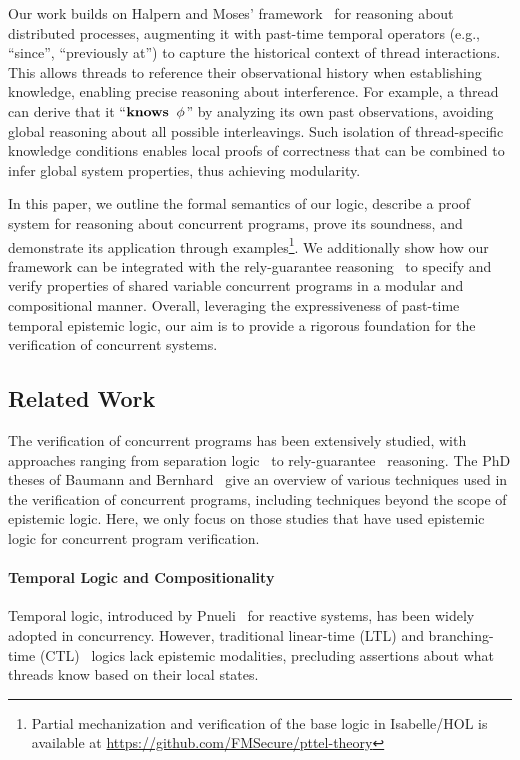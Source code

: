 Our work builds on Halpern and Moses' framework~\cite{DBLP:conf/ijcai/HalpernM85} for reasoning about distributed processes, augmenting it with past-time temporal operators (e.g., ``since'', ``previously at'') to capture the historical context of thread interactions. This allows threads to reference their observational history when establishing knowledge, enabling precise reasoning about interference. For example, a thread can derive that it ``$\mathbf{knows}\;\; \phi$'' by analyzing its own past observations, avoiding global reasoning about all possible interleavings. Such isolation of thread-specific knowledge conditions enables local proofs of correctness that can be combined to infer global system properties, thus achieving modularity.

In this paper, we outline the formal semantics of our logic, describe a proof system for reasoning about concurrent programs, prove its soundness, and demonstrate its application through examples\footnote{Partial mechanization and verification of the base logic in Isabelle/HOL is available at \url{https://github.com/FMSecure/pttel-theory}}. We additionally show how our framework can be integrated with the rely-guarantee reasoning~\cite{DBLP:phd/ethos/Jones81} to specify and verify properties of shared variable concurrent programs in a modular and compositional manner. Overall, leveraging the expressiveness of past-time temporal epistemic logic, our aim is to provide a rigorous foundation for the verification of concurrent systems.

\subsection{Related Work}
The verification of concurrent programs has been extensively studied, with approaches ranging from separation logic~\cite{DBLP:conf/concur/OHearn04} to rely-guarantee~\cite{DBLP:phd/ethos/Jones81} reasoning.
The PhD theses of Baumann and Bernhard~\cite{baumann2014ownership,kragl2020verifying} give
an overview of various techniques used in the verification of concurrent programs, including techniques beyond the scope of epistemic logic.  
Here, we only focus on those studies that have used epistemic logic for concurrent program verification.

\paragraph{Temporal Logic and Compositionality}
Temporal logic, introduced by Pnueli~\cite{DBLP:conf/focs/Pnueli77,DBLP:books/daglib/0080029} for reactive systems, has been widely adopted in concurrency. However, traditional linear-time (LTL) and branching-time (CTL)~\cite{DBLP:conf/lop/ClarkeE81} logics lack epistemic modalities, precluding assertions about what threads know based on their local states. 

